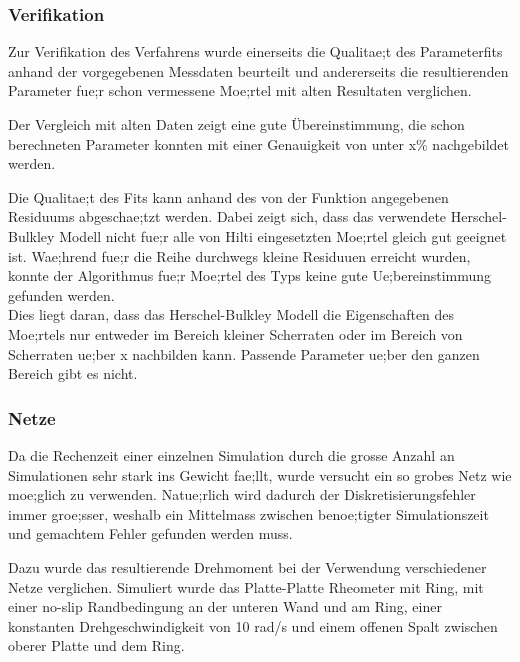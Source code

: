 \subsubsection{Verifikation}
Zur Verifikation des Verfahrens wurde einerseits die Qualitae;t des Parameterfits anhand der vorgegebenen Messdaten beurteilt und andererseits die resultierenden Parameter fue;r schon vermessene Moe;rtel mit alten Resultaten verglichen.

Der Vergleich mit alten Daten zeigt eine gute Übereinstimmung, die schon berechneten Parameter konnten mit einer Genauigkeit von unter x\%  nachgebildet werden.

Die Qualitae;t des Fits kann anhand des von der Funktion  angegebenen Residuums abgeschae;tzt werden. Dabei zeigt sich, dass das verwendete Herschel-Bulkley Modell nicht fue;r alle von Hilti eingesetzten Moe;rtel gleich gut geeignet ist. Wae;hrend fue;r die \hit{} Reihe durchwegs kleine Residuuen  erreicht wurden, konnte der Algorithmus fue;r Moe;rtel des \re{} Typs keine gute Ue;bereinstimmung gefunden werden.\\
Dies liegt daran, dass das Herschel-Bulkley Modell die Eigenschaften des Moe;rtels nur entweder im Bereich kleiner Scherraten  oder im Bereich von Scherraten ue;ber x nachbilden kann. Passende Parameter ue;ber den ganzen Bereich gibt es nicht.
%
\subsubsection{Netze}
Da die Rechenzeit einer einzelnen Simulation durch die grosse Anzahl an Simulationen sehr stark ins Gewicht fae;llt, wurde versucht ein so grobes Netz wie moe;glich zu verwenden. Natue;rlich wird dadurch der Diskretisierungsfehler immer groe;sser, weshalb ein Mittelmass zwischen benoe;tigter Simulationszeit und gemachtem Fehler gefunden werden muss.

Dazu wurde das resultierende Drehmoment bei der Verwendung verschiedener Netze verglichen. Simuliert wurde das Platte-Platte Rheometer mit Ring, mit einer no-slip Randbedingung an der unteren Wand und am Ring, einer konstanten Drehgeschwindigkeit von 10 rad/s und einem offenen Spalt zwischen oberer Platte und dem Ring.

